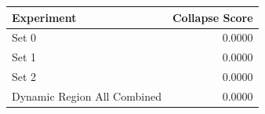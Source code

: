 \begin{tabular}{lr}
\toprule
Experiment & Collapse Score \\
\midrule
Set 0 & 0.0000 \\
Set 1 & 0.0000 \\
Set 2 & 0.0000 \\
Dynamic Region All Combined & 0.0000 \\
\bottomrule
\end{tabular}
